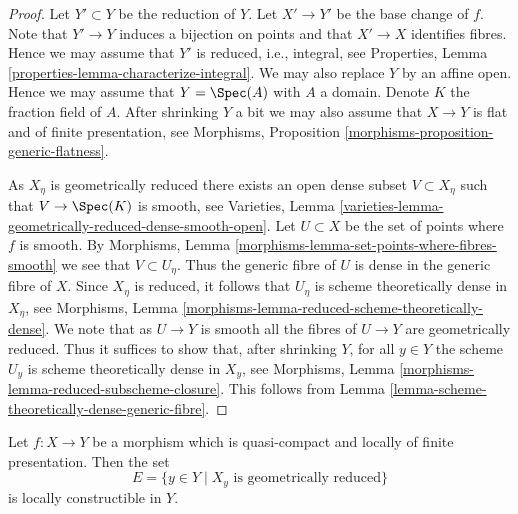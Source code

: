 \begin{proof}
Let $Y' \subset Y$ be the reduction of $Y$. Let $X' \to Y'$
be the base change of $f$. Note that $Y' \to Y$
induces a bijection on points and that $X' \to X$ identifies fibres.
Hence we may assume that $Y'$ is reduced, i.e., integral, see
Properties, Lemma \ref{properties-lemma-characterize-integral}.
We may also replace $Y$ by an affine open. Hence we may assume that
$Y = \Spec(A)$ with $A$ a domain. Denote $K$ the
fraction field of $A$. After shrinking $Y$ a bit we may also assume that
$X \to Y$ is flat and of finite presentation, see
Morphisms, Proposition \ref{morphisms-proposition-generic-flatness}.

\medskip\noindent
As $X_\eta$ is geometrically reduced there exists an open dense
subset $V \subset X_\eta$ such that $V \to \Spec(K)$ is smooth, see
Varieties, Lemma \ref{varieties-lemma-geometrically-reduced-dense-smooth-open}.
Let $U \subset X$ be the set of points where $f$ is smooth. By
Morphisms, Lemma \ref{morphisms-lemma-set-points-where-fibres-smooth}
we see that $V \subset U_\eta$. Thus the generic fibre of $U$ is dense
in the generic fibre of $X$. Since $X_\eta$ is reduced, it follows
that $U_\eta$ is scheme theoretically dense in $X_\eta$, see
Morphisms, Lemma \ref{morphisms-lemma-reduced-scheme-theoretically-dense}.
We note that as $U \to Y$ is smooth all the fibres of $U \to Y$
are geometrically reduced. Thus it suffices to show that, after
shrinking $Y$, for all $y \in Y$ the scheme $U_y$ is scheme theoretically
dense in $X_y$, see
Morphisms, Lemma \ref{morphisms-lemma-reduced-subscheme-closure}.
This follows from
Lemma \ref{lemma-scheme-theoretically-dense-generic-fibre}.
\end{proof}

\begin{lemma}
\label{lemma-geometrically-reduced-constructible}
Let $f : X \to Y$ be a morphism which is quasi-compact and
locally of finite presentation. Then the set
$$
E = \{y \in Y \mid X_y\text{ is geometrically reduced}\}
$$
is locally constructible in $Y$.
\end{lemma}

